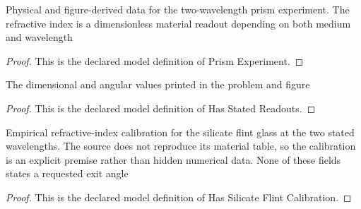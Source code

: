 \begin{definition}
  \label{def:physics:phyx-mini-0150:phyxminiproblems-problemphyxmini0150-prismexperiment}
  Physical and figure-derived data for the two-wavelength prism experiment. The refractive index is a dimensionless material readout depending on both medium and wavelength
\end{definition}
\begin{proof}
  This is the declared model definition of Prism Experiment.
\end{proof}
\begin{definition}
  \label{def:physics:phyx-mini-0150:phyxminiproblems-problemphyxmini0150-hasstatedreadouts}
  The dimensional and angular values printed in the problem and figure
\end{definition}
\begin{proof}
  This is the declared model definition of Has Stated Readouts.
\end{proof}
\begin{definition}
  \label{def:physics:phyx-mini-0150:phyxminiproblems-problemphyxmini0150-hassilicateflintcalibration}
  Empirical refractive-index calibration for the silicate flint glass at the two stated wavelengths. The source does not reproduce its material table, so the calibration is an explicit premise rather than hidden numerical data. None of these fields states a requested exit angle
\end{definition}
\begin{proof}
  This is the declared model definition of Has Silicate Flint Calibration.
\end{proof}
